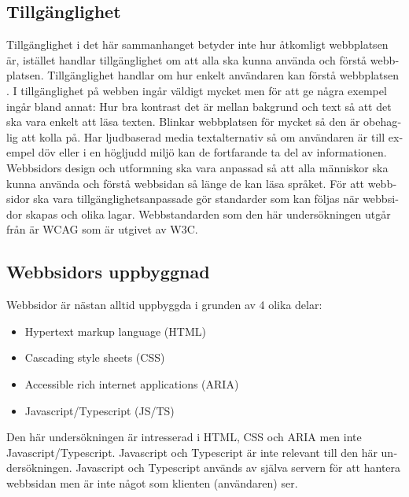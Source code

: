 \documentclass[11p]{article}
\begin{document}
\begin{otherlanguage}{swedish}
    \subsection{Tillgänglighet}
    Tillgänglighet i det här sammanhanget betyder inte hur åtkomligt webbplatsen är, istället handlar tillgänglighet om att alla ska kunna använda och förstå webbplatsen. %
    Tillgänglighet handlar om hur enkelt användaren kan förstå webbplatsen \parencite{webbriktlinjer}.
    I tillgänglighet på webben ingår väldigt mycket men för att ge några exempel ingår bland annat:
    Hur bra kontrast det är mellan bakgrund och text så att det ska vara enkelt att läsa texten.
    Blinkar webbplatsen för mycket så den är obehaglig att kolla på.
    Har ljudbaserad media textalternativ så om användaren är till exempel döv eller i en högljudd miljö kan de fortfarande ta del av informationen.
    \\Webbsidors design och utformning ska vara anpassad så att alla människor ska kunna använda och förstå webbsidan så länge de kan läsa språket.
    För att webbsidor ska vara tillgänglighetsanpassade gör standarder som kan följas när webbsidor skapas och olika lagar.
    Webbstandarden som den här undersökningen utgår från är WCAG som är utgivet av W3C.


    \subsection{Webbsidors uppbyggnad}
    Webbsidor är nästan alltid uppbyggda i grunden av 4 olika delar: %
    \begin{itemize}
        \item Hypertext markup language (HTML)
        \item Cascading style sheets (CSS)
        \item Accessible rich internet applications (ARIA)
        \item Javascript/Typescript (JS/TS)
    \end{itemize}
    Den här undersökningen är intresserad i HTML, CSS och ARIA men inte Javascript/Typescript.
    Javascript och Typescript är inte relevant till den här undersökningen.
    Javascript och Typescript används av själva servern för att hantera webbsidan men är inte något som klienten (användaren) ser. %


\end{otherlanguage}
\end{document}
